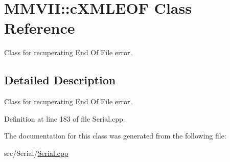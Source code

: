 \hypertarget{classMMVII_1_1cXMLEOF}{}\section{M\+M\+V\+II\+:\+:c\+X\+M\+L\+E\+OF Class Reference}
\label{classMMVII_1_1cXMLEOF}


Class for recuperating End Of File error.  




\subsection{Detailed Description}
Class for recuperating End Of File error. 

Definition at line 183 of file Serial.\+cpp.



The documentation for this class was generated from the following file\+:\begin{DoxyCompactItemize}
\item 
src/\+Serial/\hyperlink{Serial_8cpp}{Serial.\+cpp}\end{DoxyCompactItemize}
